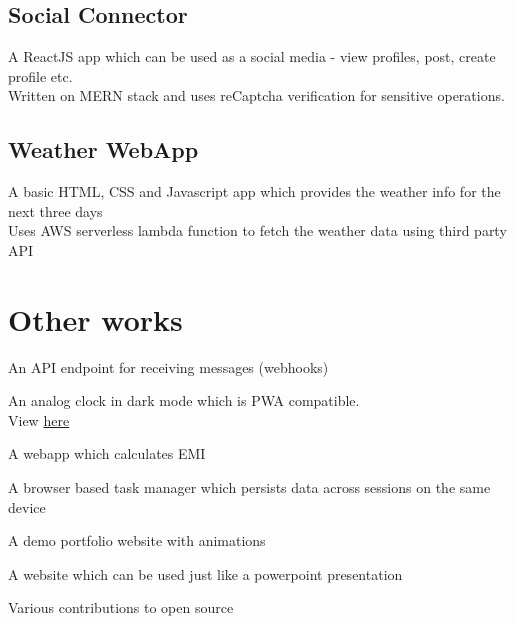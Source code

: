 \documentclass[]{deedy-resume-openfont}
\begin{document}
\begin{minipage}[t]{0.55\textwidth}
	\subsection{Social Connector}
	A ReactJS app which can be used as a social media - view profiles, post, create profile etc.\\
	Written on MERN stack and uses reCaptcha verification for sensitive operations.
	\sectionsep

	\subsection{Weather WebApp}
	A basic HTML, CSS and Javascript app which provides the weather info for the next three days\\
	Uses AWS serverless lambda function to fetch the weather data using third party API
	\sectionsep

	\section{Other works}
	\sectionsep
	\begin{tightemize}
		\item An API endpoint for receiving messages (webhooks)
		\item An analog clock in dark mode which is PWA compatible.\\
		View {\href{https://analog-clock-dark.netlify.app/}{here}}
		\item A webapp which calculates EMI
		\item A browser based task manager which persists data across sessions on the same device
		\item A demo portfolio website with animations
		\item A website which can be used just like a powerpoint presentation
		\item Various contributions to open source
	\end{tightemize}


\end{minipage}
\hfill
\end{document}
